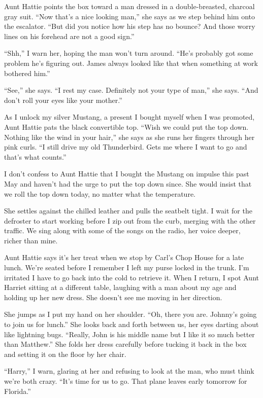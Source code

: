 \documentclass[twoside,10pt]{book}
\begin{document}
Aunt Hattie points the box toward a man dressed in a double-breasted,
charcoal gray suit. ``Now that's a nice looking man,'' she says as we
step behind him onto the escalator. ``But did you notice how his step
has no bounce? And those worry lines on his forehead are not a good
sign.''

``Shh,'' I warn her, hoping the man won't turn around. ``He's probably
got some problem he's figuring out. James always looked like that when
something at work bothered him.''

``See,'' she says. ``I rest my case. Definitely not your type of man,''
she says. ``And don't roll your eyes like your mother.''

As I unlock my silver Mustang, a present I bought myself when I was
promoted, Aunt Hattie pats the black convertible top. ``Wish we could
put the top down. Nothing like the wind in your hair,'' she says as she
runs her fingers through her pink curls. ``I still drive my old
Thunderbird. Gets me where I want to go and that's what counts.''

I don't confess to Aunt Hattie that I bought the Mustang on impulse this
past May and haven't had the urge to put the top down since. She would
insist that we roll the top down today, no matter what the temperature.

She settles against the chilled leather and pulls the seatbelt tight. I
wait for the defroster to start working before I zip out from the curb,
merging with the other traffic. We sing along with some of the songs on
the radio, her voice deeper, richer than mine.

Aunt Hattie says it's her treat when we stop by Carl's Chop House for a
late lunch. We're seated before I remember I left my purse locked in the
trunk. I'm irritated I have to go back into the cold to retrieve it.
When I return, I spot Aunt Harriet sitting at a different table,
laughing with a man about my age and holding up her new dress. She
doesn't see me moving in her direction.

She jumps as I put my hand on her shoulder. ``Oh, there you are.
Johnny's going to join us for lunch.'' She looks back and forth between
us, her eyes darting about like lightning bugs. ``Really, John is his
middle name but I like it so much better than Matthew.'' She folds her
dress carefully before tucking it back in the box and setting it on the
floor by her chair.

``Harry,'' I warn, glaring at her and refusing to look at the man, who
must think we're both crazy. ``It's time for us to go. That plane leaves
early tomorrow for Florida.''
\end{document}
